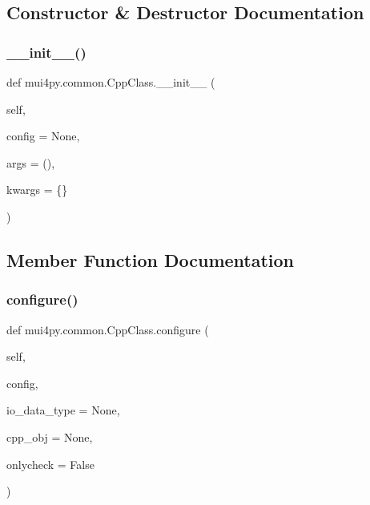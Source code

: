 \subsection{Constructor \& Destructor Documentation}
\mbox{\label{classmui4py_1_1common_1_1_cpp_class_af71dd873bcff2f831b48d0d81f900c16}} 
\subsubsection{\texorpdfstring{\+\_\+\+\_\+init\+\_\+\+\_\+()}{\_\_init\_\_()}}
{\footnotesize\ttfamily def mui4py.\+common.\+Cpp\+Class.\+\_\+\+\_\+init\+\_\+\+\_\+ (\begin{DoxyParamCaption}\item[{}]{self,  }\item[{}]{config = {\ttfamily None},  }\item[{}]{args = {\ttfamily ()},  }\item[{}]{kwargs = {\ttfamily \{\}} }\end{DoxyParamCaption})}



\subsection{Member Function Documentation}
\mbox{\label{classmui4py_1_1common_1_1_cpp_class_a72df33d8f73522f22a53f2d476eda586}} 
\subsubsection{\texorpdfstring{configure()}{configure()}}
{\footnotesize\ttfamily def mui4py.\+common.\+Cpp\+Class.\+configure (\begin{DoxyParamCaption}\item[{}]{self,  }\item[{}]{config,  }\item[{}]{io\+\_\+data\+\_\+type = {\ttfamily None},  }\item[{}]{cpp\+\_\+obj = {\ttfamily None},  }\item[{}]{onlycheck = {\ttfamily False} }\end{DoxyParamCaption})}

